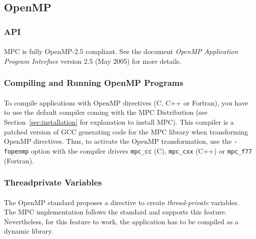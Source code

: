 \documentclass[a4paper,11pt]{article}
\begin{document}
\subsection{OpenMP}

\subsubsection{API}
\paragraph{}
MPC is fully OpenMP-2.5 compliant.
See the document \emph{OpenMP Application Program Interface} version 2.5
(May 2005) for more details.

\subsubsection{Compiling and Running OpenMP Programs}
\paragraph{}
To compile applications with OpenMP directives (C, C++ or Fortran), you have to
use the default compiler coming with the MPC Distribution (see
    Section~\ref{sec:installation} for explanation to install MPC).
This compiler is a patched version of GCC generating code for the MPC library
when transforming OpenMP directives.
Thus, to activate the OpenMP transformation, use the \texttt{-fopenmp} option
with the compiler drivers \texttt{mpc\_cc} (C), \texttt{mpc\_cxx} (C++) or \texttt{mpc\_f77} (Fortran).

\subsubsection{Threadprivate Variables}

\paragraph{}
The OpenMP standard proposes a directive to create \emph{thread-private} variables.
The MPC implementation follows the standard and supports this feature.
Nevertheless, for this feature to work, the application has to be compiled as a dynamic library.
\end{document}
